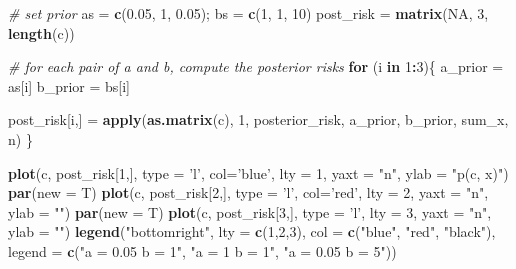 \documentclass[
]{article}
\newenvironment{Shaded}{\begin{snugshade}}{\end{snugshade}}
\newcommand{\CommentTok}[1]{\textcolor[rgb]{0.56,0.35,0.01}{\textit{#1}}}
\newcommand{\ControlFlowTok}[1]{\textcolor[rgb]{0.13,0.29,0.53}{\textbf{#1}}}
\newcommand{\DataTypeTok}[1]{\textcolor[rgb]{0.13,0.29,0.53}{#1}}
\newcommand{\DecValTok}[1]{\textcolor[rgb]{0.00,0.00,0.81}{#1}}
\newcommand{\FloatTok}[1]{\textcolor[rgb]{0.00,0.00,0.81}{#1}}
\newcommand{\KeywordTok}[1]{\textcolor[rgb]{0.13,0.29,0.53}{\textbf{#1}}}
\newcommand{\NormalTok}[1]{#1}
\newcommand{\OperatorTok}[1]{\textcolor[rgb]{0.81,0.36,0.00}{\textbf{#1}}}
\newcommand{\OtherTok}[1]{\textcolor[rgb]{0.56,0.35,0.01}{#1}}
\newcommand{\StringTok}[1]{\textcolor[rgb]{0.31,0.60,0.02}{#1}}
\begin{document}
\begin{Shaded}
\begin{Highlighting}[]
\CommentTok{# set prior}
\NormalTok{as =}\StringTok{ }\KeywordTok{c}\NormalTok{(}\FloatTok{0.05}\NormalTok{, }\DecValTok{1}\NormalTok{, }\FloatTok{0.05}\NormalTok{); bs =}\StringTok{ }\KeywordTok{c}\NormalTok{(}\DecValTok{1}\NormalTok{, }\DecValTok{1}\NormalTok{, }\DecValTok{10}\NormalTok{)}
\NormalTok{post_risk =}\StringTok{ }\KeywordTok{matrix}\NormalTok{(}\OtherTok{NA}\NormalTok{, }\DecValTok{3}\NormalTok{, }\KeywordTok{length}\NormalTok{(c))}

\CommentTok{# for each pair of a and b, compute the posterior risks}
\ControlFlowTok{for}\NormalTok{ (i }\ControlFlowTok{in} \DecValTok{1}\OperatorTok{:}\DecValTok{3}\NormalTok{)\{}
\NormalTok{  a_prior =}\StringTok{ }\NormalTok{as[i]}
\NormalTok{  b_prior =}\StringTok{ }\NormalTok{bs[i]}
  
\NormalTok{  post_risk[i,] =}\StringTok{ }\KeywordTok{apply}\NormalTok{(}\KeywordTok{as.matrix}\NormalTok{(c), }\DecValTok{1}\NormalTok{, posterior_risk, a_prior, b_prior, sum_x, n)}
\NormalTok{\}}

\KeywordTok{plot}\NormalTok{(c, post_risk[}\DecValTok{1}\NormalTok{,], }\DataTypeTok{type =} \StringTok{'l'}\NormalTok{, }\DataTypeTok{col=}\StringTok{'blue'}\NormalTok{, }\DataTypeTok{lty =} \DecValTok{1}\NormalTok{, }\DataTypeTok{yaxt =} \StringTok{"n"}\NormalTok{, }\DataTypeTok{ylab =} \StringTok{"p(c, x)"}\NormalTok{)}
\KeywordTok{par}\NormalTok{(}\DataTypeTok{new =}\NormalTok{ T)}
\KeywordTok{plot}\NormalTok{(c, post_risk[}\DecValTok{2}\NormalTok{,], }\DataTypeTok{type =} \StringTok{'l'}\NormalTok{, }\DataTypeTok{col=}\StringTok{'red'}\NormalTok{, }\DataTypeTok{lty =} \DecValTok{2}\NormalTok{, }\DataTypeTok{yaxt =} \StringTok{"n"}\NormalTok{, }\DataTypeTok{ylab =} \StringTok{""}\NormalTok{)}
\KeywordTok{par}\NormalTok{(}\DataTypeTok{new =}\NormalTok{ T)}
\KeywordTok{plot}\NormalTok{(c, post_risk[}\DecValTok{3}\NormalTok{,], }\DataTypeTok{type =} \StringTok{'l'}\NormalTok{, }\DataTypeTok{lty =} \DecValTok{3}\NormalTok{, }\DataTypeTok{yaxt =} \StringTok{"n"}\NormalTok{, }\DataTypeTok{ylab =} \StringTok{""}\NormalTok{)}
\KeywordTok{legend}\NormalTok{(}\StringTok{"bottomright"}\NormalTok{, }\DataTypeTok{lty =} \KeywordTok{c}\NormalTok{(}\DecValTok{1}\NormalTok{,}\DecValTok{2}\NormalTok{,}\DecValTok{3}\NormalTok{), }\DataTypeTok{col =} \KeywordTok{c}\NormalTok{(}\StringTok{"blue"}\NormalTok{, }\StringTok{"red"}\NormalTok{, }\StringTok{"black"}\NormalTok{), }
       \DataTypeTok{legend =} \KeywordTok{c}\NormalTok{(}\StringTok{"a = 0.05 b = 1"}\NormalTok{, }\StringTok{"a = 1 b = 1"}\NormalTok{, }\StringTok{"a = 0.05 b = 5"}\NormalTok{))}
\end{Highlighting}
\end{Shaded}
\end{document}
